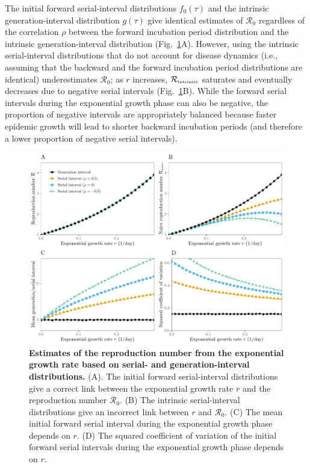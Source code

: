 \documentclass[12pt]{article}
\newcommand{\fref}[1]{Fig.~\ref{fig:#1}}
\newcommand{\Rx}[1]{\ensuremath{{\mathcal R}_{#1}}\xspace}
\newcommand{\Ro}{\Rx{0}}
\newcommand{\Rintrinsic}{\ensuremath{{\mathcal R}_{\textrm{\tiny intrinsic}}}\xspace}
\newcommand{\gdist}{g} %
\begin{document}
The initial forward serial-interval distributions $f_0(\tau)$ and the intrinsic generation-interval distribution $\gdist(\tau)$ give identical estimates of \Ro regardless of the correlation $\rho$ between the forward incubation period distribution and the intrinsic generation-interval distribution (\fref{rR}A).
However, using the intrinsic serial-interval distributions that do not account for disease dynamics (i.e., assuming that the backward and the forward incubation period distributions are identical) underestimates \Ro;
as $r$ increases, \Rintrinsic saturates and eventually decreases due to negative serial intervals (\fref{rR}B).
While the forward serial intervals during the exponential growth phase can also be negative, the proportion of negative intervals are appropriately balanced because faster epidemic growth will lead to shorter backward incubation periods (and therefore a lower proportion of negative serial intervals).

\begin{figure}[!th]
\includegraphics[width=\textwidth]{rR.pdf}
\caption{
\textbf{Estimates of the reproduction number from the exponential growth rate based on serial- and generation-interval distributions.}
(A). The initial forward serial-interval distributions give a correct link between the exponential growth rate $r$ and the reproduction number \Ro.
(B) The intrinsic serial-interval distributions give an incorrect link between $r$ and \Ro.
(C) The mean initial forward serial interval during the exponential growth phase depends on $r$.
(D) The squared coefficient of variation of the initial forward serial intervals during the exponential growth phase depends on $r$.
}
\label{fig:rR}
\end{figure}
\end{document}
